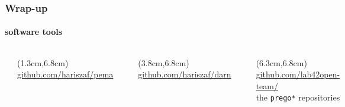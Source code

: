 \documentclass{beamer}
\begin{document}

   \begin{frame}
      \frametitle{Wrap-up}
      \framesubtitle{software tools}

      \begin{columns}[onlytextwidth]


            \includegraphics[width=25mm]{resources/pema_logo.png}

            \begin{textblock*}{3cm}(1.3cm,6.8cm)
               \tiny \href{https://github.com/hariszaf/pema}{github.com/hariszaf/pema}
            \end{textblock*}


            \includegraphics[width=25mm]{resources/darn_logo.png}
            \begin{textblock*}{3cm}(3.8cm,6.8cm)
               \tiny	 \href{https://github.com/hariszaf/darn}{github.com/hariszaf/darn}
            \end{textblock*}


            \includegraphics[width=25mm]{resources/prego_logo.png}
            \begin{textblock*}{3cm}(6.3cm,6.8cm)
               \tiny	 \href{https://github.com/lab42open-team}{github.com/lab42open-team/} \\
               \tiny the \texttt{prego*} repositories
            \end{textblock*}


\end{columns}
\end{frame}
\end{document}

